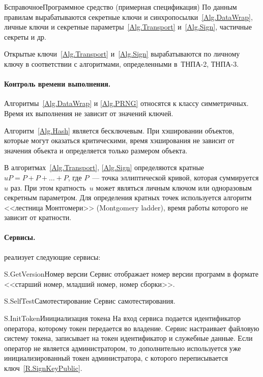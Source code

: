 \begin{appendix}{Б}{справочное}{Программное средство \CryptoDisk 
(примерная спецификация)}
По данным правилам вырабатываются 
секретные ключи и синхропосылки~\ref{Alg.DataWrap}, 
личные ключи и секретные параметры~\ref{Alg.Transport} и~\ref{Alg.Sign},
частичные секреты и др.

\clearpage

Открытые ключи~\ref{Alg.Transport} и~\ref{Alg.Sign} 
вырабатываются по личному ключу в соответствии с алгоритмами, 
определенными в~ТНПА-2, ТНПА-3.

\paragraph*{Контроль времени выполнения.} 
Алгоритмы~\ref{Alg.DataWrap} и \ref{Alg.PRNG} относятся к классу симметричных.
Время их выполнения не зависит от значений ключей.

Алгоритм~\ref{Alg.Hash} является бесключевым.
При хэшировании объектов, которые могут оказаться критическими, 
время хэширования не зависит от значения объекта
и определяется только размером объекта.

В алгоритмах~\ref{Alg.Transport}, \ref{Alg.Sign}
определяются кратные 
$uP=P+P+\ldots+P$, где $P$~--- точка эллиптической кривой,
которая суммируется $u$ раз.
При этом кратность~$u$ может являться личным ключом 
или одноразовым секретным параметром.
%
Для определения кратных точек используется 
алгоритм <<лестница Монтгомери>> (Montgomery ladder),
время работы которого не зависит от кратности.


\paragraph*{Сервисы.} 
\CryptoDisk реализует следующие сервисы:

\begin{definition}{S.GetVersion}{Номер версии}
Сервис отображает номер версии программ в формате 
<<старший номер, младший номер, номер сборки>>. 
\end{definition}

\begin{definition}{S.SelfTest}{Самотестирование}
Сервис самотестирования.
\end{definition}

\begin{definition}{S.InitToken}{Инициализация токена}
На вход сервиса подается идентификатор оператора,
которому токен передается во владение.
%
Сервис настраивает файловую систему токена,
записывает на токен идентификатор и служебные данные.
%
Если оператор не является администратором, 
то дополнительно используется уже инициализированный токен администратора,
%
с которого переписывается ключ~\ref{R.SignKeyPublic}. 
\end{definition}


\end{appendix}
